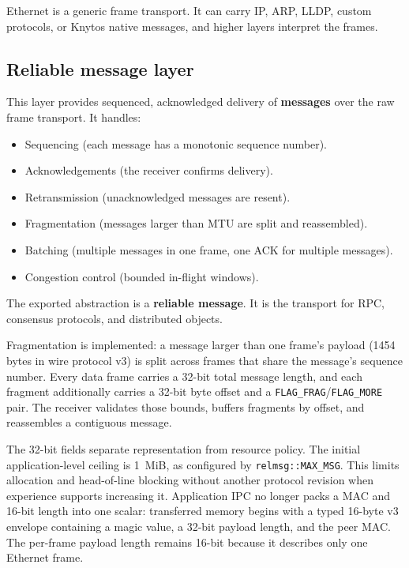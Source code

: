 Ethernet is a generic frame transport. It can carry IP, ARP, LLDP, custom
protocols, or Knytos native messages, and higher layers interpret the frames.

\subsection{Reliable message layer}

This layer provides sequenced, acknowledged delivery of \textbf{messages} over
the raw frame transport. It handles:

\begin{itemize}
    \item Sequencing (each message has a monotonic sequence number).
    \item Acknowledgements (the receiver confirms delivery).
    \item Retransmission (unacknowledged messages are resent).
    \item Fragmentation (messages larger than MTU are split and reassembled).
    \item Batching (multiple messages in one frame, one ACK for multiple messages).
    \item Congestion control (bounded in-flight windows).
\end{itemize}

The exported abstraction is a \textbf{reliable message}. It is the transport
for RPC, consensus protocols, and distributed objects.

Fragmentation is implemented: a message larger than one frame's payload (1454
bytes in wire protocol v3) is split across frames that share the message's
sequence number. Every data frame carries a 32-bit total message length, and each
fragment additionally carries a 32-bit byte offset and a
\texttt{FLAG\_FRAG}/\texttt{FLAG\_MORE} pair. The receiver validates those
bounds, buffers fragments by offset, and reassembles a contiguous message.

The 32-bit fields separate representation from resource policy. The initial
application-level ceiling is 1~MiB, as configured by
\texttt{relmsg::}\allowbreak\texttt{MAX\_MSG}. This limits
allocation and head-of-line blocking without another protocol revision when
experience supports increasing it. Application IPC no longer packs a MAC and
16-bit length into one scalar: transferred memory begins with a typed 16-byte
v3 envelope containing a magic value, a 32-bit payload length, and the peer
MAC. The per-frame payload length remains 16-bit because it describes only one
Ethernet frame.

